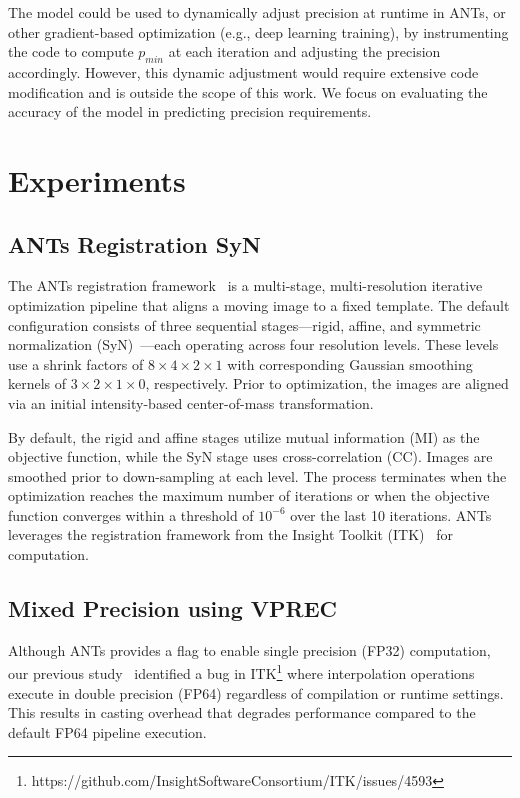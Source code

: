 \documentclass[journal,twoside,web]{ieeecolor}
\begin{document}
The model could be used to dynamically adjust precision at runtime in ANTs, or other gradient-based optimization (e.g., deep learning training), by instrumenting the code to compute $p_{min}$ at each iteration and adjusting the precision accordingly. However, this dynamic adjustment would require extensive code modification and is outside the scope of this work. We focus on evaluating the accuracy of the model in predicting precision requirements.

\section{Experiments}
\label{sec:experiments}
\subsection{ANTs Registration SyN}
The ANTs registration framework~\cite{Avants2020-xx} is a multi-stage, multi-resolution iterative optimization pipeline that aligns a moving image to a fixed template. The default configuration consists of three sequential stages---rigid, affine, and symmetric normalization (SyN)~\cite{Avants2008-ea}---each operating across four resolution levels. These levels use a shrink factors of $8\times4\times2\times1$ with corresponding Gaussian smoothing kernels of $3\times2\times1\times0$, respectively. Prior to optimization, the images are aligned via an initial intensity-based center-of-mass transformation.

By default, the rigid and affine stages utilize mutual information (MI) as the objective
function, while the SyN stage uses cross-correlation (CC). Images are smoothed
prior to down-sampling at each level. The process terminates when the
optimization reaches the maximum number of iterations or when the objective
function converges within a threshold of $10^{-6}$ over the last 10 iterations.
ANTs leverages the registration framework from the Insight Toolkit
(ITK)~\cite{Yoo2002-ve, McCormick2014-ok} for computation.

\subsection{Mixed Precision using VPREC}
Although ANTs provides a flag to enable single precision (FP32) computation, our previous study~\cite{Dugre2025-fs} identified a bug in ITK\footnote{https://github.com/InsightSoftwareConsortium/ITK/issues/4593} where interpolation operations execute in double precision (FP64) regardless of compilation or runtime settings. This results in casting overhead that degrades performance compared to the default FP64 pipeline execution.
\end{document}
